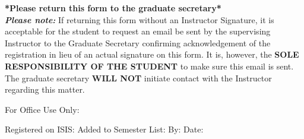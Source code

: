 \documentclass[11pt]{article}
\begin{document}
\small{\textbf{*Please return this form to the graduate secretary*}\\
\textit{\textbf{Please note:}} If returning this form without an Instructor Signature, it is acceptable for the student to request an email be sent by the supervising
Instructor to the Graduate Secretary confirming acknowledgement of the registration in lieu of an actual signature on this form. It is,
however, the \textbf{SOLE RESPONSIBILITY OF THE STUDENT} to make sure this email is sent. The graduate secretary \textbf{WILL NOT}
initiate contact with the Instructor regarding this matter.\\

\hrulefill

For Office Use Only:\\

\vspace{0.5cm}

Registered on ISIS: \underline{\hspace{1in}} Added to Semester List: \underline{\hspace{1in}} By:\underline{\hspace{1.5in}} Date:\underline{\hspace{0.99in}}
}
\end{document}
